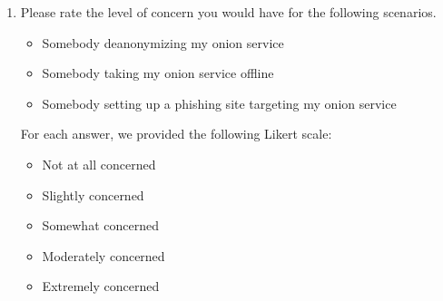 \begin{enumerate}
    \item Please rate the level of concern you would have for the following
        scenarios.
        \begin{itemize}
            \item Somebody deanonymizing my onion service
            \item Somebody taking my onion service offline
            \item Somebody setting up a phishing site targeting my onion service
        \end{itemize}
        For each answer, we provided the following Likert scale:
        \begin{itemize}
            \item Not at all concerned
            \item Slightly concerned
            \item Somewhat concerned
            \item Moderately concerned
            \item Extremely concerned
        \end{itemize}
\end{enumerate}

